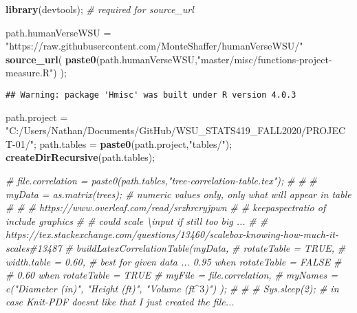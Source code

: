 \documentclass[]{article}
\newenvironment{Shaded}{\begin{snugshade}}{\end{snugshade}}
\newcommand{\CommentTok}[1]{\textcolor[rgb]{0.56,0.35,0.01}{\textit{#1}}}
\newcommand{\KeywordTok}[1]{\textcolor[rgb]{0.13,0.29,0.53}{\textbf{#1}}}
\newcommand{\NormalTok}[1]{#1}
\newcommand{\StringTok}[1]{\textcolor[rgb]{0.31,0.60,0.02}{#1}}
\begin{document}
\vskip -8.5pt




\noindent  

\begin{Shaded}
\begin{Highlighting}[]
\KeywordTok{library}\NormalTok{(devtools);       }\CommentTok{\# required for source\_url}

\NormalTok{path.humanVerseWSU =}\StringTok{ "https://raw.githubusercontent.com/MonteShaffer/humanVerseWSU/"}
\KeywordTok{source\_url}\NormalTok{( }\KeywordTok{paste0}\NormalTok{(path.humanVerseWSU,}\StringTok{"master/misc/functions{-}project{-}measure.R"}\NormalTok{) );}
\end{Highlighting}
\end{Shaded}

\begin{verbatim}
## Warning: package 'Hmisc' was built under R version 4.0.3
\end{verbatim}

\begin{Shaded}
\begin{Highlighting}[]
\NormalTok{path.project =}\StringTok{ "C:/Users/Nathan/Documents/GitHub/WSU\_STATS419\_FALL2020/PROJECT{-}01/"}\NormalTok{;}
\NormalTok{path.tables =}\StringTok{ }\KeywordTok{paste0}\NormalTok{(path.project,}\StringTok{"tables/"}\NormalTok{);}
  \KeywordTok{createDirRecursive}\NormalTok{(path.tables);}
\end{Highlighting}
\end{Shaded}

\begin{Shaded}
\begin{Highlighting}[]
\CommentTok{\# file.correlation = paste0(path.tables,"tree{-}correlation{-}table.tex");}
\CommentTok{\# }
\CommentTok{\# }
\CommentTok{\# myData = as.matrix(trees);  \# numeric values only, only what will appear in table}
\CommentTok{\# }
\CommentTok{\# \# https://www.overleaf.com/read/srzhrcryjpwn}
\CommentTok{\# \# keepaspectratio of include graphics }
\CommentTok{\# \# could scale \textbackslash{}input if still too big ...}
\CommentTok{\# \# https://tex.stackexchange.com/questions/13460/scalebox{-}knowing{-}how{-}much{-}it{-}scales\#13487}
\CommentTok{\# buildLatexCorrelationTable(myData, }
\CommentTok{\#   rotateTable = TRUE,}
\CommentTok{\#   width.table = 0.60, \# best for given data ... 0.95 when rotateTable = FALSE}
\CommentTok{\#                       \# 0.60 when rotateTable = TRUE}
\CommentTok{\#   myFile = file.correlation,}
\CommentTok{\#   myNames = c("Diameter (in)", "Height (ft)", "Volume (ft$\^{}3$)") );}
\CommentTok{\# }
\CommentTok{\# }
\CommentTok{\# Sys.sleep(2); \# in case Knit{-}PDF doesn\textquotesingle{}t like that I just created the file...}
\end{Highlighting}
\end{Shaded}
\end{document}
